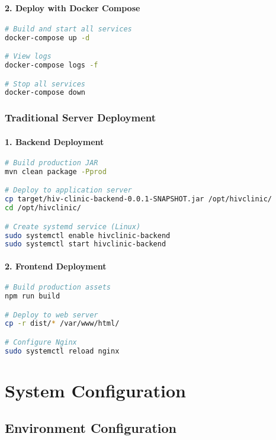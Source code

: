 \documentclass[12pt,a4paper]{article}
\begin{document}
\paragraph{2. Deploy with Docker Compose}
\begin{lstlisting}[language=bash]
# Build and start all services
docker-compose up -d

# View logs
docker-compose logs -f

# Stop all services
docker-compose down
\end{lstlisting}

\subsubsection{Traditional Server Deployment}

\paragraph{1. Backend Deployment}
\begin{lstlisting}[language=bash]
# Build production JAR
mvn clean package -Pprod

# Deploy to application server
cp target/hiv-clinic-backend-0.0.1-SNAPSHOT.jar /opt/hivclinic/
cd /opt/hivclinic/

# Create systemd service (Linux)
sudo systemctl enable hivclinic-backend
sudo systemctl start hivclinic-backend
\end{lstlisting}

\paragraph{2. Frontend Deployment}
\begin{lstlisting}[language=bash]
# Build production assets
npm run build

# Deploy to web server
cp -r dist/* /var/www/html/

# Configure Nginx
sudo systemctl reload nginx
\end{lstlisting}

\section{System Configuration}

\subsection{Environment Configuration}
\end{document}
